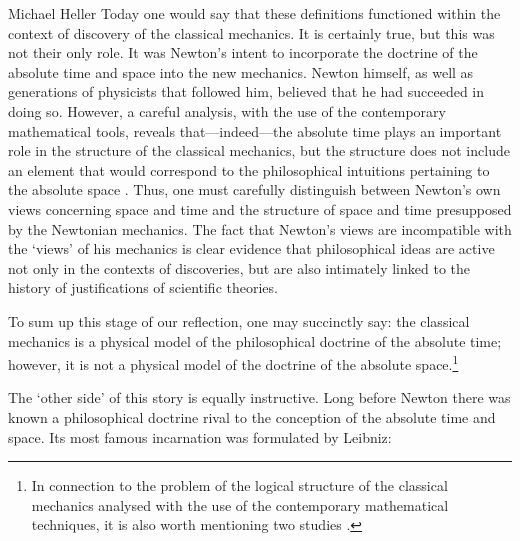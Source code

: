 \begin{artengenv}{Michael Heller}
Today one would say that these definitions functioned
within the context of discovery of the classical mechanics. It is certainly true, but this was not their only role. It
was Newton's intent to incorporate the doctrine of the absolute time and space into the new mechanics. Newton himself,
as well as generations of physicists that followed him, believed that he had succeeded in doing so. However, a careful
analysis, with the use of the contemporary mathematical tools, reveals that---indeed---the absolute time plays an important
role in the structure of the classical mechanics, but the structure does not include an element that would correspond
to the philosophical intuitions pertaining to the absolute space
\parencite[pp.57--81]{raine_science_1981}.
Thus, one must carefully distinguish between Newton's own views concerning space and time and the structure
of space and time presupposed by the Newtonian mechanics. The fact that Newton's views are incompatible with the
`views' of his mechanics is clear evidence that philosophical ideas are active not only in the contexts of discoveries,
but are also intimately linked to the history of justifications of scientific theories.

To sum up this stage of our reflection, one may succinctly say: the classical mechanics is a physical model of the
philosophical doctrine of the absolute time; however, it is not a physical model of the doctrine of the absolute
space.\footnote{In connection to the problem of the logical structure of the classical mechanics analysed with the use
of the contemporary mathematical techniques, it is also worth mentioning two studies
\parencite{friedman_foundations_1983,torretti_relativity_1983}.
}

The `other side' of this story is equally instructive. Long before Newton there was known a philosophical doctrine
rival to the conception of the absolute time and space. Its most famous incarnation was formulated by Leibniz:



\end{artengenv}
